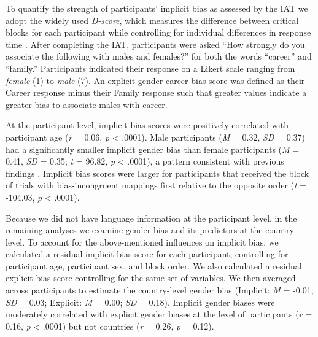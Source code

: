 \documentclass[9pt,twocolumn,twoside]{pnas-new}
\begin{document}
To quantify the strength of participants’ implicit bias as assessed by the IAT we adopt the widely used  \emph{D-score}, which measures the difference between critical blocks for each participant while controlling for individual differences
in response time \cite{greenwald1998measuring}. After completing
the IAT, participants were asked \enquote{How strongly do you associate
the following with males and females?} for both the words
\enquote{career} and \enquote{family.} Participants indicated their
response on a Likert scale ranging from \emph{female} (1) to \emph{male}
(7). An explicit gender-career bias score was defined as their Career response minus their Family response such that greater values indicate a greater bias to associate males with career.

At the participant level, implicit bias scores were positively correlated with
participant age (\emph{r} = 0.06, \emph{p} \textless{} .0001). Male participants (\emph{M} = 0.32, \emph{SD} = 0.37) had a significantly smaller implicit gender bias than female participants (\emph{M} = 0.41, \emph{SD} = 0.35; \emph{t} = 96.82, \emph{p} \textless{} .0001), a pattern consistent with previous findings \cite{nosek2002harvesting}. Implicit bias scores were larger for participants that received the block of trials with bias-incongruent mappings first relative to the opposite order (\emph{t} = -104.03, \emph{p} \textless{} .0001).

Because we did not have language information at the participant level, in the remaining analyses we examine gender bias and its predictors at the country level. To account for the above-mentioned influences on implicit bias, we calculated a residual implicit bias score for each participant, controlling for participant age, participant sex, and block order. We also calculated a residual explicit bias score controlling for the same set of variables. We then averaged across participants to estimate the country-level gender bias (Implicit: \emph{M} = -0.01; \emph{SD} = 0.03; Explicit: \emph{M} = 0.00; \emph{SD} = 0.18). Implicit gender biases were moderately correlated with explicit gender biases at the level of participants (\emph{r} = 0.16, \emph{p} \textless{} .0001) but not countries (\emph{r} = 0.26, \emph{p} = 0.12).
\end{document}
